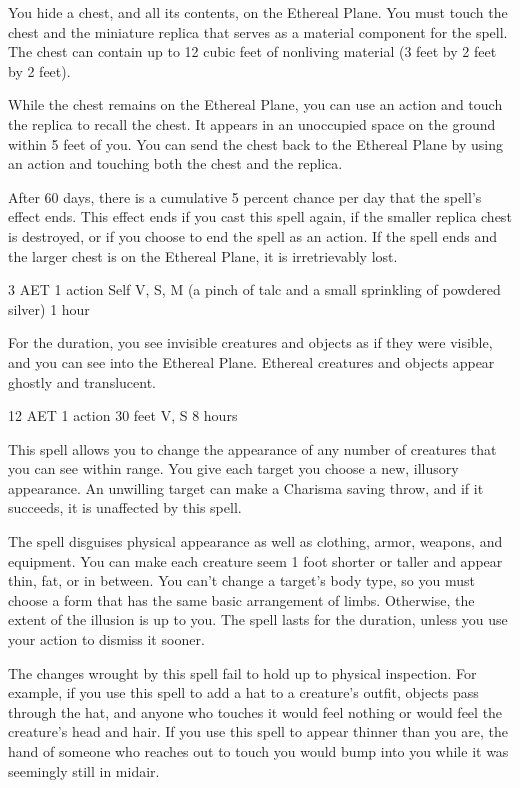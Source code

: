 You hide a chest, and all its contents, on the Ethereal Plane. You must touch the chest and the miniature replica that serves as a material component for the spell. The chest can contain up to 12 cubic feet of nonliving material (3 feet by 2 feet by 2 feet).

While the chest remains on the Ethereal Plane, you can use an action and touch the replica to recall the chest. It appears in an unoccupied space on the ground within 5 feet of you. You can send the chest back to the Ethereal Plane by using an action and touching both the chest and the replica.

After 60 days, there is a cumulative 5 percent chance per day that the spell's effect ends. This effect ends if you cast this spell again, if the smaller replica chest is destroyed, or if you choose to end the spell as an action. If the spell ends and the larger chest is on the Ethereal Plane, it is irretrievably lost.

{3 AET}
{1 action}
{Self}
{V, S, M (a pinch of talc and a small sprinkling of powdered silver)}
{1 hour}

For the duration, you see invisible creatures and objects as if they were visible, and you can see into the Ethereal Plane. Ethereal creatures and objects appear ghostly and translucent.

{12 AET}
{1 action}
{30 feet}
{V, S}
{8 hours}

This spell allows you to change the appearance of any number of creatures that you can see within range. You give each target you choose a new, illusory appearance. An unwilling target can make a Charisma saving throw, and if it succeeds, it is unaffected by this spell.

The spell disguises physical appearance as well as clothing, armor, weapons, and equipment. You can make each creature seem 1 foot shorter or taller and appear thin, fat, or in between. You can't change a target's body type, so you must choose a form that has the same basic arrangement of limbs. Otherwise, the extent of the illusion is up to you. The spell lasts for the duration, unless you use your action to dismiss it sooner.

The changes wrought by this spell fail to hold up to physical inspection. For example, if you use this spell to add a hat to a creature's outfit, objects pass through the hat, and anyone who touches it would feel nothing or would feel the creature's head and hair. If you use this spell to appear thinner than you are, the hand of someone who reaches out to touch you would bump into you while it was seemingly still in midair.

